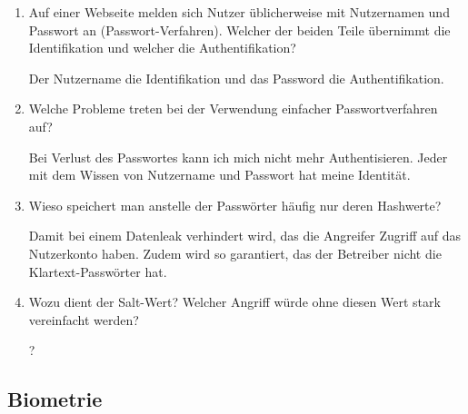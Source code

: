 \documentclass[a4paper]{article}
\begin{document}
\begin{enumerate}
    \item Auf einer Webseite melden sich Nutzer üblicherweise mit Nutzernamen und Passwort an (Passwort-Verfahren). Welcher der beiden Teile übernimmt die Identifikation und welcher die Authentifikation?
    
    Der Nutzername die Identifikation und das Password die Authentifikation.
    \item Welche Probleme treten bei der Verwendung einfacher Passwortverfahren auf?
    
    Bei Verlust des Passwortes kann ich mich nicht mehr Authentisieren. Jeder mit dem Wissen von Nutzername und Passwort hat meine Identität.
    \item Wieso speichert man anstelle der Passwörter häufig nur deren Hashwerte?
    
    Damit bei einem Datenleak verhindert wird, das die Angreifer Zugriff auf das Nutzerkonto haben. Zudem wird so garantiert, das der Betreiber nicht die Klartext-Passwörter hat.
    \item Wozu dient der Salt-Wert? Welcher Angriff würde ohne diesen Wert stark vereinfacht werden?
    
    ?
\end{enumerate}

\subsection{Biometrie}
\end{document}
